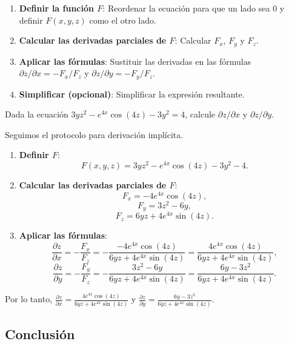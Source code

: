 \begin{pasos}[Protocolo para derivación implícita de $z$ definida por $F(x, y, z) = 0$]
\begin{enumerate}
    \item \textbf{Definir la función $F$}: Reordenar la ecuación para que un lado sea $0$ y definir $F(x, y, z)$ como el otro lado.
    \item \textbf{Calcular las derivadas parciales de $F$}: Calcular $F_x$, $F_y$ y $F_z$.
    \item \textbf{Aplicar las fórmulas}: Sustituir las derivadas en las fórmulas $\partial z/\partial x = -F_x/F_z$ y $\partial z/\partial y = -F_y/F_z$.
    \item \textbf{Simplificar (opcional)}: Simplificar la expresión resultante.
\end{enumerate}
\end{pasos}

\begin{example}
Dada la ecuación $3yz^2 - e^{4x}\cos(4z) - 3y^2 = 4$, calcule $\partial z/\partial x$ y $\partial z/\partial y$.
\end{example}
\begin{myproof}
Seguimos el protocolo para derivación implícita.
\begin{enumerate}
    \item \textbf{Definir $F$}:
    \[
    F(x, y, z) = 3yz^2 - e^{4x}\cos(4z) - 3y^2 - 4.
    \]
    \item \textbf{Calcular las derivadas parciales de $F$}:
    \[
    F_x = -4e^{4x}\cos(4z),
    \]
    \[
    F_y = 3z^2 - 6y,
    \]
    \[
    F_z = 6yz + 4e^{4x}\sin(4z).
    \]
    \item \textbf{Aplicar las fórmulas}:
    \[
    \frac{\partial z}{\partial x} = -\frac{F_x}{F_z} = -\frac{-4e^{4x}\cos(4z)}{6yz + 4e^{4x}\sin(4z)} = \frac{4e^{4x}\cos(4z)}{6yz + 4e^{4x}\sin(4z)},
    \]
    \[
    \frac{\partial z}{\partial y} = -\frac{F_y}{F_z} = -\frac{3z^2 - 6y}{6yz + 4e^{4x}\sin(4z)} = \frac{6y - 3z^2}{6yz + 4e^{4x}\sin(4z)}.
    \]
\end{enumerate}
Por lo tanto, $\boxed{\frac{\partial z}{\partial x} = \frac{4e^{4x}\cos(4z)}{6yz + 4e^{4x}\sin(4z)}}$ y $\boxed{\frac{\partial z}{\partial y} = \frac{6y - 3z^2}{6yz + 4e^{4x}\sin(4z)}}$.
\end{myproof}

\subsection{Conclusión}

